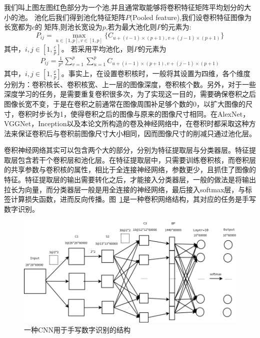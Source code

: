我们叫上图左图红色部分为一个池,并且通常取能够将卷积特征矩阵平均划分的大小的池。
池化后我们得到池化特征矩阵$P$(Pooled feature),我们设卷积特征图像为长宽都为$c$的
矩阵,则池长宽设为$p$,若为最大池化则$P$的元素为:
\begin{equation}
P_{ij}=\max_{u\in[1,p],v\in[1,p]}\{C_{u+(i-1)\times(p+1),v+(j-1)\times(p+1)}\}
\end{equation}
其中，$i,j\in[1,\frac{c}{p}]$。
若采用平均池化，则$P$的元素为
\begin{eqnarray}
P_{ij}=\frac{1}{p^2}\sum_{v=1}^p\sum_{u=1}^pC_{u+(i-1)\times(p+1),v+(j-1)\times(p+1)}
\end{eqnarray}
其中，$i,j\in[1,\frac{c}{p}]$。事实上，在设置卷积核时，一般将其设置为四维，各个维度分别为：卷积核长、卷积核宽、上一层的图像深度，卷积核个数。另外，对于一些深度学习的任务，是需要重复卷积很多次，为了实现这一目的，需要确保卷积之后图像长宽不变，于是在卷积之前通常在图像周围补足够个数的0，以扩大图像的尺寸，卷积时步长为1，使得卷积之后的图像与原来的图像尺寸相同。在AlexNet，VGGNet，Inception以及本论文所构造的卷及神经网络中，在卷积时都采取这种方法来保证卷积后与卷积前图像尺寸大小相同，因而图像尺寸的削减只通过池化层。

卷积神经网络其实可以包含两个大的部分，分别为特征提取层与分类器层。特征提取层包含若干个卷积层和池化层。在特征提取层中，只需要训练卷积核，而卷积层的共享参数与卷积核的属性，相比于全连接神经网络，参数更少，且抓住了图像的特征。特征提取层的输出需要转化之后，才能接入分类器层，一般的做法是将输出拉长为向量，而分类器层一般是用全连接的神经网络，最后接入softmax层，与标签计算损失函数，进而反向传播。图~\ref{fig:cnn3}是一种卷积网络结构，其对应的任务是手写数字识别。
\begin{figure}[htb]
\centering
\includegraphics[scale=0.4]{../figures/CNN1.png} 
\caption{一种CNN用于手写数字识别的结构}
\label{fig:cnn3}
\end{figure}

